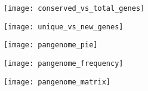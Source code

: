 \begin{figure}[h!]	%
     \centering
     \begin{subfigure}[b]{0.4\textwidth}
         \centering
         \texttt{[image: conserved\_vs\_total\_genes]}
         \caption{}
         \label{fig:conserved vs total}
     \end{subfigure}
     \hfill
     \begin{subfigure}[b]{0.4\textwidth}
         \centering
         \texttt{[image: unique\_vs\_new\_genes]}
         \caption{}
         \label{fig:unique vs new}
     \end{subfigure}
     \hfill
     \begin{subfigure}[b]{0.45\textwidth}
         \centering
         \texttt{[image: pangenome\_pie]}
         \caption{}
         \label{fig:pangenome pie}
     \end{subfigure}
     \hfill
     \begin{subfigure}[b]{0.45\textwidth}
         \centering
         \texttt{[image: pangenome\_frequency]}
         \caption{}
         \label{fig:pangeome frequency}
     \end{subfigure}
     \hfill
     \begin{subfigure}[b]{0.85\textwidth}
         \centering
         \texttt{[image: pangenome\_matrix]}
         \caption{}
         \label{fig:pangenome matrix}
     \end{subfigure}
        \caption{}
        \label{fig:pangenome}
\end{figure}



% 





















